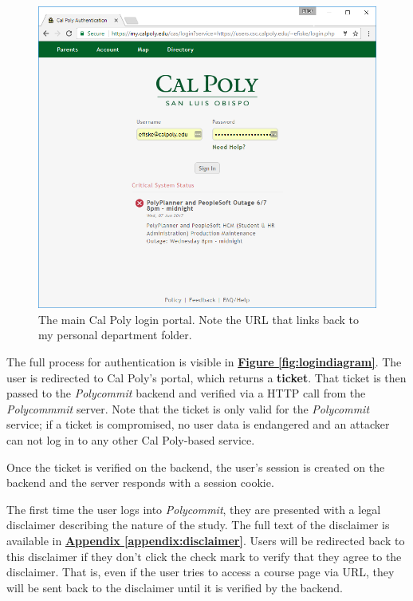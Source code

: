 \begin{figure}[h]
	\includegraphics[width=1.0\linewidth]{figures/onboarding-portal}
	\caption{The main Cal Poly login portal. Note the URL that links back to my personal department folder.}
	\label{fig:onboarding1}
\end{figure}

\par The full process for authentication is visible in \textbf{\hyperref[fig:logindiagram]{Figure \ref*{fig:logindiagram}}}. The user is redirected to Cal Poly's portal, which returns a \textbf{ticket}. That ticket is then passed to the \textit{Polycommit} backend and verified via a HTTP call from the \textit{Polycommmit} server. Note that the ticket is only valid for the \textit{Polycommit} service; if a ticket is compromised, no user data is endangered and an attacker can not log in to any other Cal Poly-based service.

\par Once the ticket is verified on the backend, the user's session is created on the backend and the server responds with a session cookie.

\par The first time the user logs into \textit{Polycommit}, they are presented with a legal disclaimer describing the nature of the study. The full text of the disclaimer is available in \textbf{\hyperref[appendix:disclaimer]{Appendix \ref*{appendix:disclaimer}}}. Users will be redirected back to this disclaimer if they don't click the check mark to verify that they agree to the disclaimer. That is, even if the user tries to access a course page via URL, they will be sent back to the disclaimer until it is verified by the backend.

